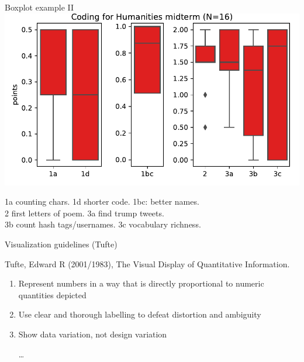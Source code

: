 \documentclass[aspectratio=169,usenames,dvipsnames]{beamer}
\begin{document}
\begin{frame}{Boxplot example II}\centering
\includegraphics[height=0.75\textheight]{fig/boxplotcmp}

1a counting chars. 1d shorter code. 1bc: better names. \\
2 first letters of poem. 3a find trump tweets. \\
3b count hash tags/usernames. 3c vocabulary richness.
\end{frame}

\begin{frame}{Visualization guidelines (Tufte)}
    \begin{reference}
        Tufte, Edward R (2001/1983), The Visual Display of Quantitative Information.
    \end{reference}
\begin{enumerate}
    \item Represent numbers in a way that is directly proportional to numeric quantities depicted
    \item Use clear and thorough labelling to defeat distortion and ambiguity
    \item Show data variation, not design variation
    \item [\dots]
\end{enumerate}
\end{frame}
\end{document}
